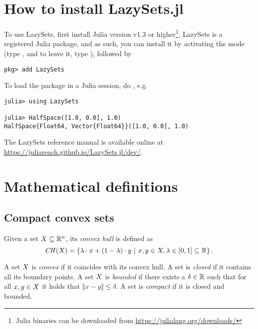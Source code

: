 \appendix
\section{How to install LazySets.jl}\label{sec:installation}

To use LazySets, first install Julia version v1.3 or higher\footnote{Julia binaries can be downloaded from \href{the official website}{https://julialang.org/downloads/}}. LazySets is a registered Julia package, and as such, you can install it by activating the  mode (type \code{]}, and to leave it, type ),
followed by

\begin{minipage}{\linewidth}
\begin{lstlisting}
pkg> add LazySets
\end{lstlisting}
\end{minipage}
To load the package in a Julia session, do , e.g.

\begin{minipage}{\linewidth}
	\begin{lstlisting}
julia> using LazySets

julia> HalfSpace([1.0, 0.0], 1.0)
HalfSpace{Float64, Vector{Float64}}([1.0, 0.0], 1.0)
	\end{lstlisting}
\end{minipage}

The LazySets reference manual is available online at
\href{https://juliareach.github.io/LazySets.jl/dev/}{https://juliareach.github.io/LazySets.jl/dev/}.

\section{Mathematical definitions}\label{sec:mathdef}

\subsection{Compact convex sets}\label{sec:convexdef}

Given a set $X \subseteq \mathbb{R}^n$, its \emph{convex hull} is defined as
%
\[
	\mathit{CH}(X) = \left\{ \lambda \cdot x + (1 - \lambda) \cdot y ~\middle|~ x, y \in X, \lambda \in [0, 1] \subseteq \mathbb{R} \right\}.
\]

A set $X$ is \emph{convex} if it coincides with its convex hull.
%
A set is \emph{closed} if it contains all its boundary points.
%
A set $X$ is \emph{bounded} if there exists a $\delta \in \mathbb{R}$ such that for all $x, y \in X$ it holds that $\Vert x - y \Vert \leq \delta$.
%
A set is \emph{compact} if it is closed and bounded.

